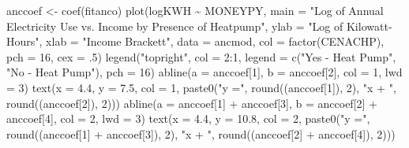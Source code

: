 \documentclass[
]{article}
\newenvironment{Shaded}{\begin{snugshade}}{\end{snugshade}}
\newcommand{\AttributeTok}[1]{\textcolor[rgb]{0.77,0.63,0.00}{#1}}
\newcommand{\DecValTok}[1]{\textcolor[rgb]{0.00,0.00,0.81}{#1}}
\newcommand{\FloatTok}[1]{\textcolor[rgb]{0.00,0.00,0.81}{#1}}
\newcommand{\FunctionTok}[1]{\textcolor[rgb]{0.00,0.00,0.00}{#1}}
\newcommand{\NormalTok}[1]{#1}
\newcommand{\OtherTok}[1]{\textcolor[rgb]{0.56,0.35,0.01}{#1}}
\newcommand{\SpecialCharTok}[1]{\textcolor[rgb]{0.00,0.00,0.00}{#1}}
\newcommand{\StringTok}[1]{\textcolor[rgb]{0.31,0.60,0.02}{#1}}
\begin{document}
\begin{Shaded}
\begin{Highlighting}[]
\NormalTok{anccoef }\OtherTok{\textless{}{-}} \FunctionTok{coef}\NormalTok{(fitanco)}
\FunctionTok{plot}\NormalTok{(logKWH }\SpecialCharTok{\textasciitilde{}}\NormalTok{ MONEYPY,}
     \AttributeTok{main =} \StringTok{"Log of Annual Electricity Use vs. Income by Presence of Heatpump"}\NormalTok{,}
     \AttributeTok{ylab =} \StringTok{"Log of Kilowatt{-}Hours"}\NormalTok{,}
     \AttributeTok{xlab =} \StringTok{"Income Brackett"}\NormalTok{,}
     \AttributeTok{data =}\NormalTok{ ancmod, }\AttributeTok{col =} \FunctionTok{factor}\NormalTok{(CENACHP), }\AttributeTok{pch =} \DecValTok{16}\NormalTok{, }\AttributeTok{cex =}\NormalTok{ .}\DecValTok{5}\NormalTok{)}
\FunctionTok{legend}\NormalTok{(}\StringTok{"topright"}\NormalTok{, }\AttributeTok{col =} \DecValTok{2}\SpecialCharTok{:}\DecValTok{1}\NormalTok{, }\AttributeTok{legend =} \FunctionTok{c}\NormalTok{(}\StringTok{"Yes {-} Heat Pump"}\NormalTok{, }\StringTok{"No {-} Heat Pump"}\NormalTok{), }\AttributeTok{pch =} \DecValTok{16}\NormalTok{)}
\FunctionTok{abline}\NormalTok{(}\AttributeTok{a =}\NormalTok{ anccoef[}\DecValTok{1}\NormalTok{], }\AttributeTok{b =}\NormalTok{ anccoef[}\DecValTok{2}\NormalTok{], }\AttributeTok{col =} \DecValTok{1}\NormalTok{, }\AttributeTok{lwd =} \DecValTok{3}\NormalTok{)}
\FunctionTok{text}\NormalTok{(}\AttributeTok{x =} \FloatTok{4.4}\NormalTok{, }\AttributeTok{y =} \FloatTok{7.5}\NormalTok{, }\AttributeTok{col =} \DecValTok{1}\NormalTok{,}
     \FunctionTok{paste0}\NormalTok{(}\StringTok{"y ="}\NormalTok{, }\FunctionTok{round}\NormalTok{((anccoef[}\DecValTok{1}\NormalTok{]), }\DecValTok{2}\NormalTok{), }\StringTok{"x + "}\NormalTok{, }\FunctionTok{round}\NormalTok{((anccoef[}\DecValTok{2}\NormalTok{]), }\DecValTok{2}\NormalTok{)))}
\FunctionTok{abline}\NormalTok{(}\AttributeTok{a =}\NormalTok{ anccoef[}\DecValTok{1}\NormalTok{] }\SpecialCharTok{+}\NormalTok{ anccoef[}\DecValTok{3}\NormalTok{], }\AttributeTok{b =}\NormalTok{ anccoef[}\DecValTok{2}\NormalTok{] }\SpecialCharTok{+}\NormalTok{ anccoef[}\DecValTok{4}\NormalTok{], }\AttributeTok{col =} \DecValTok{2}\NormalTok{, }\AttributeTok{lwd =} \DecValTok{3}\NormalTok{)}
\FunctionTok{text}\NormalTok{(}\AttributeTok{x =} \FloatTok{4.4}\NormalTok{, }\AttributeTok{y =} \FloatTok{10.8}\NormalTok{, }\AttributeTok{col =} \DecValTok{2}\NormalTok{,}
     \FunctionTok{paste0}\NormalTok{(}\StringTok{"y ="}\NormalTok{, }\FunctionTok{round}\NormalTok{((anccoef[}\DecValTok{1}\NormalTok{] }\SpecialCharTok{+}\NormalTok{ anccoef[}\DecValTok{3}\NormalTok{]), }\DecValTok{2}\NormalTok{), }\StringTok{"x + "}\NormalTok{, }\FunctionTok{round}\NormalTok{((anccoef[}\DecValTok{2}\NormalTok{] }\SpecialCharTok{+}\NormalTok{ anccoef[}\DecValTok{4}\NormalTok{]), }\DecValTok{2}\NormalTok{)))}
\end{Highlighting}
\end{Shaded}
\end{document}
